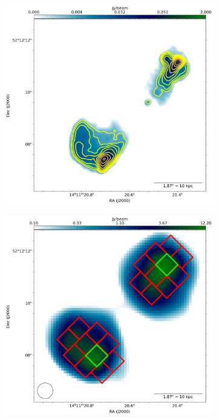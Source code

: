 \begin{figure}[h!]
	\centering
	\begin{subfigure}{.3\textwidth}
		\includegraphics[width=\linewidth]{ProjetRecherche/3C295_martin_flux.png}
	\end{subfigure}
	\hfill	
	\begin{subfigure}{.3\textwidth}
		\vspace{0.45cm}
		\includegraphics[width=\linewidth]{ProjetRecherche/ccplot_boxes_reg.png}

\end{subfigure}
\end{figure}
